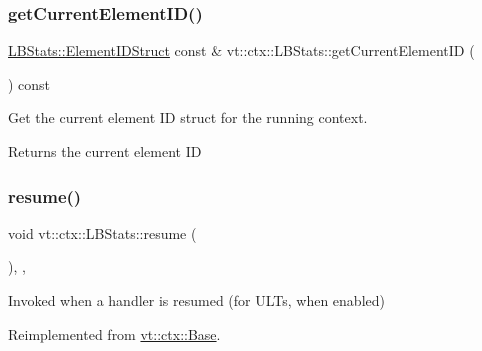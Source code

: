 \mbox{\label{structvt_1_1ctx_1_1_l_b_stats_acfcb5bb3b554fa1992525ec04d46b69e}} 
\subsubsection{\texorpdfstring{get\+Current\+Element\+I\+D()}{getCurrentElementID()}}
{\footnotesize\ttfamily \hyperlink{structvt_1_1ctx_1_1_l_b_stats_a9806d27212bffbbac72eb1e05f9e9880}{L\+B\+Stats\+::\+Element\+I\+D\+Struct} const  \& vt\+::ctx\+::\+L\+B\+Stats\+::get\+Current\+Element\+ID (\begin{DoxyParamCaption}{ }\end{DoxyParamCaption}) const}



Get the current element ID struct for the running context. 

\begin{DoxyReturn}{Returns}
the current element ID 
\end{DoxyReturn}
\mbox{\label{structvt_1_1ctx_1_1_l_b_stats_a099850f1bd53aafe650ed9e3958ca54b}} 
\subsubsection{\texorpdfstring{resume()}{resume()}}
{\footnotesize\ttfamily void vt\+::ctx\+::\+L\+B\+Stats\+::resume (\begin{DoxyParamCaption}{ }\end{DoxyParamCaption})\hspace{0.3cm}{\ttfamily [final]}, {\ttfamily [override]}, {\ttfamily [virtual]}}



Invoked when a handler is resumed (for U\+L\+Ts, when enabled) 



Reimplemented from \hyperlink{structvt_1_1ctx_1_1_base_a303afabb40ed83057fbe30c744db95da}{vt\+::ctx\+::\+Base}.

\mbox{\label{structvt_1_1ctx_1_1_l_b_stats_af8d33aaf1858c87072cfbc19c5d649a8}} 
